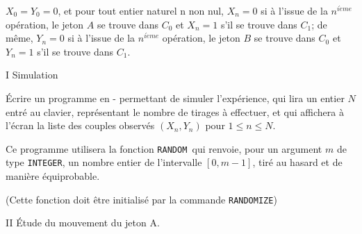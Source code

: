 \documentclass[11pt]{article}%
\begin{document}
$X_{0} = Y_{0} = 0$, et pour tout entier naturel n non nul, $X_{n} = 0$
si à
l'issue de la $n^{i\grave{e}me}$ opération, le jeton $A$ se trouve dans
$C_{0}$ et $X_{n} = 1$ s'il se trouve dans $C_{1}$; de même, $Y_{n} =
0$ si
à l'issue de la $n^{i\grave{e}me}$ opération, le jeton $B$ se trouve
dans $C_{0}$ et $Y_{n} = 1$ s'il se trouve dans $C_{1}.$


{\large I Simulation}


Écrire un programme en -\Scilab{} permettant de simuler l'expérience,
qui lira un entier $N$ entré au clavier, représentant le nombre de
tirages à effectuer, et qui affichera à l'écran la liste des
couples observés $\left( X_{n},Y_{n}\right) $ pour $1\leq n\leq N.$


Ce programme utilisera la fonction \texttt{RANDOM }qui renvoie, pour un
argument $m$ de type \texttt{INTEGER}, un nombre entier de l'intervalle
$\left[ 0,m-1\right] $, tiré au hasard et de manière équiprobable.


(Cette fonction doit être initialisé par la commande
\texttt{RANDOMIZE})





{\Large II Étude du mouvement du jeton A.}
\end{document}
